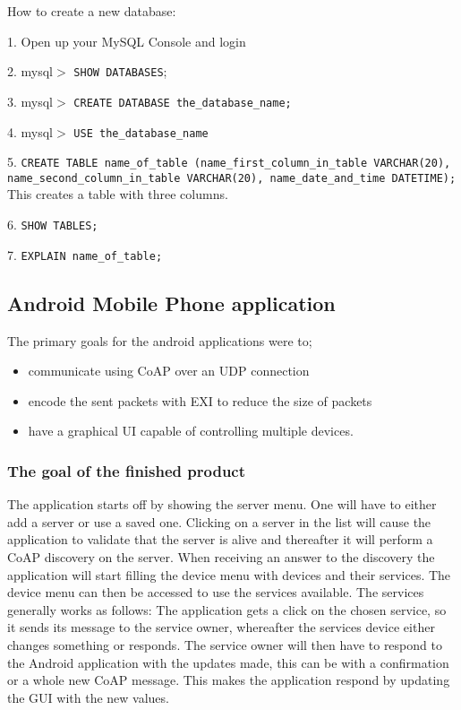 How to create a new database:

1. 	Open up your MySQL Console and login

2. 	mysql$>$ \texttt{SHOW\ DATABASES};

3. 	mysql$>$ \texttt{CREATE DATABASE the\_database\_name;}

4. 	mysql$>$ \texttt{USE the\_database\_name}

5. 	\texttt{CREATE TABLE name\_of\_table (name\_first\_column\_in\_table VARCHAR(20), name\_second\_column\_in\_table VARCHAR(20), name\_date\_and\_time\ DATETIME);}
	This creates a table with three columns.
	
6. 	\texttt{SHOW\ TABLES;}

7. 	\texttt{EXPLAIN name\_of\_table;}

\subsection{Android Mobile Phone application}

The primary goals for the android applications were to;
\begin{itemize}
 \item communicate using CoAP over an UDP connection
 \item encode the sent packets with EXI to reduce the size of packets
 \item have a graphical UI capable of controlling multiple devices.
\end{itemize}

\subsubsection{The goal of the finished product}

The application starts off by showing the server menu. One will have to either add a server or use a saved one. 
Clicking on a server in the list will cause the application to validate that the server is alive and thereafter it will perform a CoAP discovery on the server. 
When receiving an answer to the discovery the application will start filling the device menu with devices and their services. The device menu can then be accessed to use the services available.
The services generally works as follows: The application gets a click on the chosen service, so it sends its message to the service owner, whereafter the services device either changes something or responds.
The service owner will then have to respond to the Android application with the updates made, this can be with a confirmation or a whole new CoAP message. This makes the application respond by updating the GUI with the new values.\smallskip

